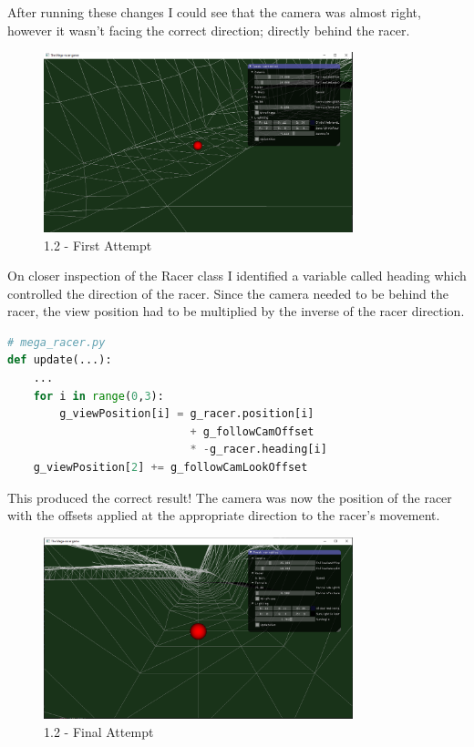 \documentclass[a4 paper, 12pt]{article}
\begin{document}
After running these changes I could see that the camera was almost right, however it wasn't facing the correct direction; directly behind the racer. 
    \begin{figure} [H]
        \centering
        \includegraphics[width=0.8\textwidth, frame]
            {./images/mega_racer/1.2_a.PNG}
        \caption{1.2 - First Attempt}
    \end{figure}

On closer inspection of the Racer class I identified a variable called heading which controlled the direction of the racer. Since the camera needed to be behind the racer, the view position had to be multiplied by the inverse of the racer direction.
    \begin{lstlisting}[language=python]
# mega_racer.py
def update(...):
    ...        
    for i in range(0,3):
        g_viewPosition[i] = g_racer.position[i] 
                            + g_followCamOffset 
                            * -g_racer.heading[i]
    g_viewPosition[2] += g_followCamLookOffset
    \end{lstlisting}

This produced the correct result! The camera was now the position of the racer with the offsets applied at the appropriate direction to the racer's movement.
    \begin{figure} [H]
        \centering
        \includegraphics[width=0.8\textwidth, frame]
            {./images/mega_racer/1.2_b.PNG}
        \caption{1.2 - Final Attempt}
    \end{figure}  
\end{document}
